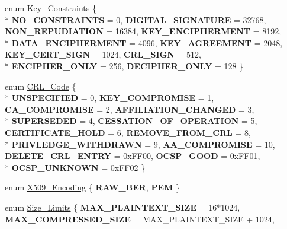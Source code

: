 \begin{DoxyCompactItemize}
enum \hyperlink{namespaceBotan_aed0885e5c70627dd43827b966e727654}{Key\-\_\-\-Constraints} \{ \\*
{\bfseries N\-O\-\_\-\-C\-O\-N\-S\-T\-R\-A\-I\-N\-T\-S} = 0, 
{\bfseries D\-I\-G\-I\-T\-A\-L\-\_\-\-S\-I\-G\-N\-A\-T\-U\-R\-E} = 32768, 
{\bfseries N\-O\-N\-\_\-\-R\-E\-P\-U\-D\-I\-A\-T\-I\-O\-N} = 16384, 
{\bfseries K\-E\-Y\-\_\-\-E\-N\-C\-I\-P\-H\-E\-R\-M\-E\-N\-T} = 8192, 
\\*
{\bfseries D\-A\-T\-A\-\_\-\-E\-N\-C\-I\-P\-H\-E\-R\-M\-E\-N\-T} = 4096, 
{\bfseries K\-E\-Y\-\_\-\-A\-G\-R\-E\-E\-M\-E\-N\-T} = 2048, 
{\bfseries K\-E\-Y\-\_\-\-C\-E\-R\-T\-\_\-\-S\-I\-G\-N} = 1024, 
{\bfseries C\-R\-L\-\_\-\-S\-I\-G\-N} = 512, 
\\*
{\bfseries E\-N\-C\-I\-P\-H\-E\-R\-\_\-\-O\-N\-L\-Y} = 256, 
{\bfseries D\-E\-C\-I\-P\-H\-E\-R\-\_\-\-O\-N\-L\-Y} = 128
 \}
\item 
enum \hyperlink{namespaceBotan_a781d47b68b281fe5b934138d13de2dfc}{C\-R\-L\-\_\-\-Code} \{ \\*
{\bfseries U\-N\-S\-P\-E\-C\-I\-F\-I\-E\-D} = 0, 
{\bfseries K\-E\-Y\-\_\-\-C\-O\-M\-P\-R\-O\-M\-I\-S\-E} = 1, 
{\bfseries C\-A\-\_\-\-C\-O\-M\-P\-R\-O\-M\-I\-S\-E} = 2, 
{\bfseries A\-F\-F\-I\-L\-I\-A\-T\-I\-O\-N\-\_\-\-C\-H\-A\-N\-G\-E\-D} = 3, 
\\*
{\bfseries S\-U\-P\-E\-R\-S\-E\-D\-E\-D} = 4, 
{\bfseries C\-E\-S\-S\-A\-T\-I\-O\-N\-\_\-\-O\-F\-\_\-\-O\-P\-E\-R\-A\-T\-I\-O\-N} = 5, 
{\bfseries C\-E\-R\-T\-I\-F\-I\-C\-A\-T\-E\-\_\-\-H\-O\-L\-D} = 6, 
{\bfseries R\-E\-M\-O\-V\-E\-\_\-\-F\-R\-O\-M\-\_\-\-C\-R\-L} = 8, 
\\*
{\bfseries P\-R\-I\-V\-L\-E\-D\-G\-E\-\_\-\-W\-I\-T\-H\-D\-R\-A\-W\-N} = 9, 
{\bfseries A\-A\-\_\-\-C\-O\-M\-P\-R\-O\-M\-I\-S\-E} = 10, 
{\bfseries D\-E\-L\-E\-T\-E\-\_\-\-C\-R\-L\-\_\-\-E\-N\-T\-R\-Y} = 0x\-F\-F00, 
{\bfseries O\-C\-S\-P\-\_\-\-G\-O\-O\-D} = 0x\-F\-F01, 
\\*
{\bfseries O\-C\-S\-P\-\_\-\-U\-N\-K\-N\-O\-W\-N} = 0x\-F\-F02
 \}
\item 
enum \hyperlink{namespaceBotan_a53759b4ed1fb93549f307fcf68729d2f}{X509\-\_\-\-Encoding} \{ {\bfseries R\-A\-W\-\_\-\-B\-E\-R}, 
{\bfseries P\-E\-M}
 \}
\item 
enum \hyperlink{namespaceBotan_af1fb5604c83d2556129a7c04045197f4}{Size\-\_\-\-Limits} \{ {\bfseries M\-A\-X\-\_\-\-P\-L\-A\-I\-N\-T\-E\-X\-T\-\_\-\-S\-I\-Z\-E} = 16$\ast$1024, 
{\bfseries M\-A\-X\-\_\-\-C\-O\-M\-P\-R\-E\-S\-S\-E\-D\-\_\-\-S\-I\-Z\-E} = M\-A\-X\-\_\-\-P\-L\-A\-I\-N\-T\-E\-X\-T\-\_\-\-S\-I\-Z\-E + 1024, 

\end{DoxyCompactItemize}
